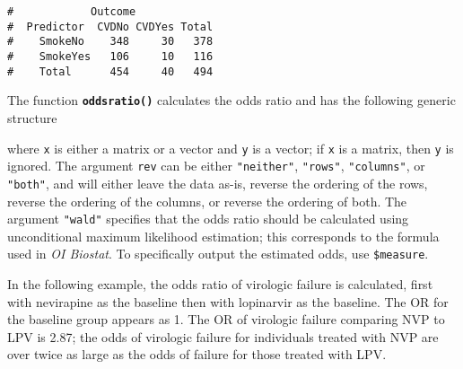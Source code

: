 \documentclass[letterpaper,12pt,twoside,]{pinp}
\begin{document}
\begin{ShadedResult}
\begin{verbatim}
#            Outcome
#  Predictor  CVDNo CVDYes Total
#    SmokeNo    348     30   378
#    SmokeYes   106     10   116
#    Total      454     40   494
\end{verbatim}
\end{ShadedResult}

The function \textbf{\texttt{oddsratio()}} calculates the odds ratio and
has the following generic structure

\begin{Shaded}
\begin{Highlighting}[]
 \NormalTok{, } \NormalTok{, } \NormalTok{)}\OperatorTok{$}
\end{Highlighting}
\end{Shaded}

where \texttt{x} is either a matrix or a vector and \texttt{y} is a
vector; if \texttt{x} is a matrix, then \texttt{y} is ignored. The
argument \texttt{rev} can be either \texttt{"neither"}, \texttt{"rows"},
\texttt{"columns"}, or \texttt{"both"}, and will either leave the data
as-is, reverse the ordering of the rows, reverse the ordering of the
columns, or reverse the ordering of both. The argument \texttt{"wald"}
specifies that the odds ratio should be calculated using unconditional
maximum likelihood estimation; this corresponds to the formula used in
\emph{OI Biostat}. To specifically output the estimated odds, use
\texttt{\$measure}.

In the following example, the odds ratio of virologic failure is
calculated, first with nevirapine as the baseline then with lopinarvir
as the baseline. The OR for the baseline group appears as 1. The OR of
virologic failure comparing NVP to LPV is 2.87; the odds of virologic
failure for individuals treated with NVP are over twice as large as the
odds of failure for those treated with LPV.

\begin{Shaded}
\begin{Highlighting}[]
 \NormalTok{)}\OperatorTok{$}
\end{Highlighting}
\end{Shaded}
\end{document}
